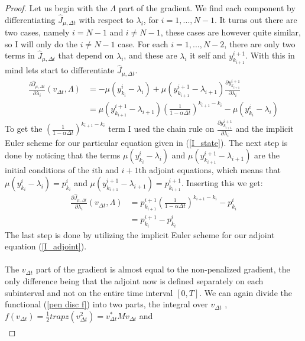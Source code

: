 \begin{proof}
Let us begin with the $\Lambda$ part of the gradient. We find each component by differentiating $\hat J_{\mu,\Delta t} $ with respect to $\lambda_i$, for $i=1,...,N-1$. It turns out there are two cases, namely $i=N-1$ and $i\neq N-1$, these cases are however quite similar, so I will only do the $i\neq N-1$ case. For each $i=1,...,N-2$, there are only two terms in $\hat J_{\mu,\Delta t} $ that depend on $\lambda_i$, and these are $\lambda_i$ it self and $y_{k_{i+1}}^{i+1}$. With this in mind lets start to differentiate $\hat J_{\mu,\Delta t} $.
\begin{align*}
\frac{\partial\hat J_{\mu,\Delta t}}{\partial \lambda_i}(v_{\Delta t},\Lambda) &=-\mu (y_{k_i}^i-\lambda_i) +\mu(y_{k_{i+1}}^{i+1}-\lambda_{i+1})\frac{\partial y_{k_{i+1}}^{i+1}}{\partial \lambda_i}  \\
&=\mu(y_{k_{i+1}}^{i+1}-\lambda_{i+1})(\frac{1}{1-\alpha\Delta t})^{k_{i+1}-k_i} -\mu (y_{k_i}^i-\lambda_i)
\end{align*}
To get the $(\frac{1}{1-\alpha\Delta t})^{k_{i+1}-k_i}$ term I used the chain rule on $\frac{\partial y_{k_{i+1}}^{i+1}}{\partial \lambda_i}$ and the implicit Euler scheme for our particular equation given in (\ref{I_state}). The next step is done by noticing that the terms $\mu (y_{k_i}^i-\lambda_i)$ and $\mu(y_{k_{i+1}}^{i+1}-\lambda_{i+1})$ are the initial conditions of the $i$th and $i+1$th adjoint equations, which means that $\mu (y_{k_i}^i-\lambda_i)=p_{k_i}^{i}$ and $\mu(y_{k_{i+1}}^{i+1}-\lambda_{i+1})=p_{k_{i+1}}^{i+1}$. Inserting this we get:
\begin{align*}
\frac{\partial\hat J_{\mu,\Delta t}}{\partial \lambda_i}(v_{\Delta t},\Lambda) &=p_{k_{i+1}}^{i+1}(\frac{1}{1-\alpha\Delta t})^{k_{i+1}-k_i} -p_{k_i}^{i} \\
&= p_{k_{i}}^{i+1}-p_{k_i}^{i}
\end{align*}
The last step is done by utilizing the implicit Euler scheme for our adjoint equation (\ref{I_adjoint}).
\\
\\
The $v_{\Delta t}$ part of the gradient is almost equal to the non-penalized gradient, the only difference being that the adjoint now is defined separately on each subinterval and not on the entire time interval $[0,T]$. We can again divide the functional (\ref{pen disc f}) into two parts, the integral over $v_{\Delta t}$ , $f(v_{\Delta t})=\frac{1}{2} trapz(v_{\Delta t}^2)=v_{\Delta t}^*Mv_{\Delta t}$ and 
\begin{align*}

\end{align*}
\end{proof}
